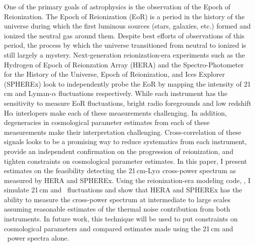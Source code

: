 One of the primary goals of astrophysics is the observation of the Epoch of Reionization.
The Epoch of Reionization (EoR) is a period in the history of the universe during
which the first luminous sources (stars, galaxies, etc.) formed and ionized the neutral gas around them.
Despite best efforts of observations of this period, the process by which the universe
transitioned from neutral to ionized is still largely a mystery. Next-generation reionization-era
experiments such as the Hydrogen of Epoch of Reionzation Array (HERA) and the Spectro-Photometer
for the History of the Universe, Epoch of Reionization, and Ices Explorer (SPHEREx)
look to independently probe the EoR by mapping the intensity of 21\,cm and Lyman-$\alpha$
fluctuations respectively. While each instrument has the sensitivity to measure
EoR fluctuations, bright radio foregrounds and low redshift H$\alpha$
interlopers make each of these measurements challenging. In addition, degeneracies
in cosmological parameter estimates from each of these measurements make their
interpretation challenging.  Cross-correlation of these signals looks to be a promising way to reduce
systematics from each instrument, provide an independent confirmation
on the progression of reionization, and tighten constraints on cosmological parameter
estimates. In this paper, I present estimates on the feasibility detecting the 21\,cm-Ly$\alpha$
cross-power spectrum as measured by HERA and SPHEREx. Using the reionization-era modeling
code, \fastsim, I simulate 21\,cm and \lya\ fluctuations and show that HERA and SPHEREx has
the ability to measure the cross-power spectrum at intermediate to large scales assuming reasonable
estimates of the thermal noise contribution from both instruments. In future work,
this technique will be used to put constraints on cosmological parameters and compared
estimates made using the 21\,cm and \lya\ power spectra alone.

\newpage
